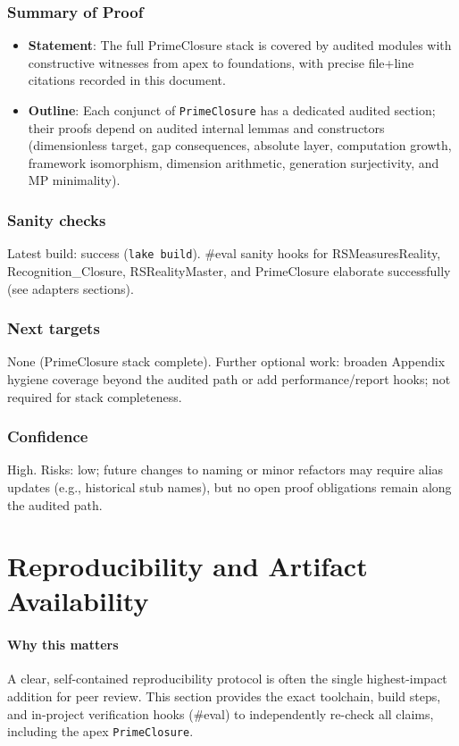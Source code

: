 \documentclass{article}
\begin{document}
\subsubsection{Summary of Proof}
\begin{itemize}[leftmargin=*]
  \item \textbf{Statement}: The full PrimeClosure stack is covered by audited modules with constructive witnesses from apex to foundations, with precise file+line citations recorded in this document.
  \item \textbf{Outline}: Each conjunct of \texttt{PrimeClosure} has a dedicated audited section; their proofs depend on audited internal lemmas and constructors (dimensionless target, gap consequences, absolute layer, computation growth, framework isomorphism, dimension arithmetic, generation surjectivity, and MP minimality).
\end{itemize}

\subsubsection{Sanity checks}
Latest build: success (\texttt{lake build}). #eval sanity hooks for RSMeasuresReality, Recognition\_Closure, RSRealityMaster, and PrimeClosure elaborate successfully (see adapters sections).

\subsubsection{Next targets}
None (PrimeClosure stack complete). Further optional work: broaden Appendix hygiene coverage beyond the audited path or add performance/report hooks; not required for stack completeness.

\subsubsection{Confidence}
High. Risks: low; future changes to naming or minor refactors may require alias updates (e.g., historical stub names), but no open proof obligations remain along the audited path.

\section{Reproducibility and Artifact Availability}
\paragraph{Why this matters} A clear, self-contained reproducibility protocol is often the single highest-impact addition for peer review. This section provides the exact toolchain, build steps, and in-project verification hooks (\#eval) to independently re-check all claims, including the apex \texttt{PrimeClosure}.
\end{document}
